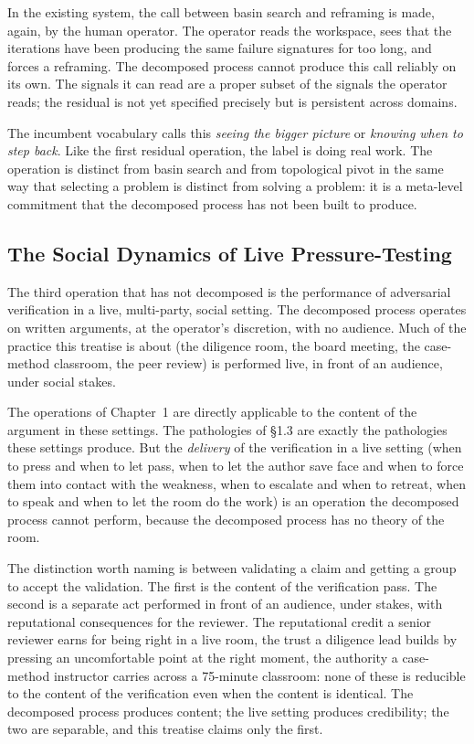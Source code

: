 \documentclass[11pt]{article}
\begin{document}
In the existing system, the call between basin search and reframing is made, again, by the human operator. The operator reads the workspace, sees that the iterations have been producing the same failure signatures for too long, and forces a reframing. The decomposed process cannot produce this call reliably on its own. The signals it can read are a proper subset of the signals the operator reads; the residual is not yet specified precisely but is persistent across domains.

The incumbent vocabulary calls this \emph{seeing the bigger picture} or \emph{knowing when to step back}. Like the first residual operation, the label is doing real work. The operation is distinct from basin search and from topological pivot in the same way that selecting a problem is distinct from solving a problem: it is a meta-level commitment that the decomposed process has not been built to produce.

\subsection{The Social Dynamics of Live Pressure-Testing}

The third operation that has not decomposed is the performance of adversarial verification in a live, multi-party, social setting. The decomposed process operates on written arguments, at the operator's discretion, with no audience. Much of the practice this treatise is about (the diligence room, the board meeting, the case-method classroom, the peer review) is performed live, in front of an audience, under social stakes.

The operations of Chapter~1 are directly applicable to the content of the argument in these settings. The pathologies of \S1.3 are exactly the pathologies these settings produce. But the \emph{delivery} of the verification in a live setting (when to press and when to let pass, when to let the author save face and when to force them into contact with the weakness, when to escalate and when to retreat, when to speak and when to let the room do the work) is an operation the decomposed process cannot perform, because the decomposed process has no theory of the room.

The distinction worth naming is between validating a claim and getting a group to accept the validation. The first is the content of the verification pass. The second is a separate act performed in front of an audience, under stakes, with reputational consequences for the reviewer. The reputational credit a senior reviewer earns for being right in a live room, the trust a diligence lead builds by pressing an uncomfortable point at the right moment, the authority a case-method instructor carries across a 75-minute classroom: none of these is reducible to the content of the verification even when the content is identical. The decomposed process produces content; the live setting produces credibility; the two are separable, and this treatise claims only the first.
\end{document}
